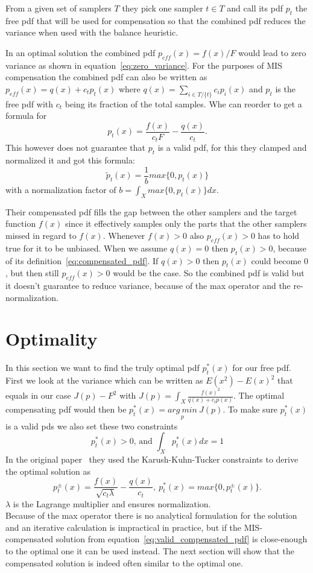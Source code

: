 From a given set of samplers $ T $ they pick one sampler $ t \in T $ and call its pdf $ p_t $ the free pdf that will be used for compensation
so that the combined pdf reduces the variance when used with the balance heuristic.

In an optimal solution the combined pdf $ p_{eff}(x) = f(x)/F $ would lead to zero variance as shown in equation~\ref{eq:zero_variance}.
For the purposes of MIS compensation the combined pdf can also be written as $ p_{eff}(x) = q(x) + c_t p_t(x) $ where $ q(x) = \sum_{i \in T/\{t\}} c_i p_i(x) $
and $ p_t $ is the free pdf with $ c_t $ being its fraction of the total samples.
Whe can reorder to get a formula for
\begin{equation}
    \label{eq:compensated_pdf}
    p_t(x) = \frac{f(x)}{c_t F} - \frac{q(x)}{c_t}.
\end{equation}
This however does not guarantee that $ p_t $ is a valid pdf,
for this they clamped and normalized it and got this formula:
\begin{equation}
    \label{eq:valid_compensated_pdf}
    \tilde{p}_t(x) = \frac{1}{b} max\{0, p_t(x)\}
\end{equation}
with a normalization factor of $ b = \int_X max\{0, p_t(x)\} dx $.

Their compensated pdf fills the gap between the other samplers and the target function $ f(x) $
since it effectively samples only the parts that the other samplers missed in regard to $ f(x) $.
Whenever $ f(x) > 0 $ also $ p_{eff}(x) > 0 $ has to hold true for it to be unbiased.
When we assume $ q(x) = 0 $ then $ p_t(x) > 0 $, because of its definition~\ref{eq:compensated_pdf}.
If $ q(x) > 0 $ then $ p_t(x) $ could become $ 0 $, but then still $ p_{eff}(x) > 0 $ would be the case.
So the combined pdf is valid but it doesn't guarantee to reduce variance, because of the max operator and the re-normalization.


\section{Optimality}
\label{sec:misc_optimality}
In this section we want to find the truly optimal pdf $ p_t^*(x) $ for our free pdf.
First we look at the variance
which can be written as $ E(x^2) - E(x)^2 $ that equals in our case $ J(p) - F^2 $ with $ J(p) = \int_X \frac{f(x)^2}{q(x) + c_t p(x)} $.
The optimal compensating pdf would then be $ p_t^*(x) = \underset{p}{arg~min}~J(p) $.
To make sure $ p_t^*(x) $ is a valid pds we also set these two constraints $$ p_t^*(x) > 0 \text{, and } \int_X p_t^*(x) dx = 1 $$
In the original paper~\cite{Karlik2019} they used the Karush-Kuhn-Tucker constraints
to derive the optimal solution as $$ p_t^{\pm}(x) = \frac{f(x)}{\sqrt{c_t \lambda}} - \frac{q(x)}{c_t},~p_t^*(x) = max\{0, p_t^{\pm}(x)\}. $$
$ \lambda $ is the Lagrange multiplier and ensures normalization.\\
Because of the max operator there is no analytical formulation for the solution and an iterative calculation is impractical in practice,
but if the MIS-compensated solution from equation~\ref{eq:valid_compensated_pdf} is close-enough to the optimal one it can be used instead.
The next section will show that the compensated solution is indeed often similar to the optimal one.


